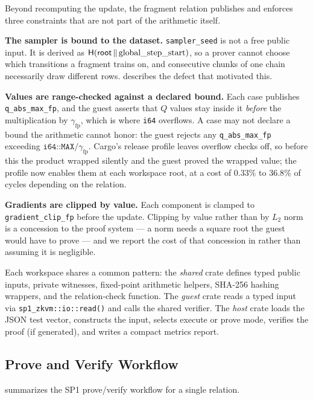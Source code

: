 Beyond recomputing the update, the fragment relation publishes and enforces
three constraints that are not part of the arithmetic itself.

\textbf{The sampler is bound to the dataset.} \texttt{sampler\_seed} is not a
free public input. It is derived as
$\mathsf{H}(\mathsf{root} \,\|\, \mathrm{global\_step\_start})$, so a prover cannot
choose which transitions a fragment trains on, and consecutive chunks of one
chain necessarily draw different rows.  describes
the defect that motivated this.

\textbf{Values are range-checked against a declared bound.} Each case publishes
\texttt{q\_abs\_max\_fp}, and the guest asserts that $Q$ values stay inside it
\emph{before} the multiplication by $\gamma_{\mathrm{fp}}$, which is where \texttt{i64}
overflows. A case may not declare a bound the arithmetic cannot honor: the
guest rejects any \texttt{q\_abs\_max\_fp} exceeding
$\texttt{i64::MAX} / \gamma_{\mathrm{fp}}$. Cargo's release profile leaves overflow checks
off, so before this the product wrapped silently and the guest proved the
wrapped value; the profile now enables them at each workspace root, at a cost
of $0.33\%$ to $36.8\%$ of cycles depending on the relation.

\textbf{Gradients are clipped by value.} Each component is clamped to
\texttt{gradient\_clip\_fp} before the update. Clipping by value rather than by
$L_2$ norm is a concession to the proof system --- a norm needs a square root
the guest would have to prove --- and we report the cost of that concession in
 rather than assuming it is negligible.

\noindent Each workspace shares a common pattern: the \emph{shared} crate
defines typed public inputs, private witnesses, fixed-point arithmetic helpers,
SHA-256 hashing wrappers, and the relation-check function. The \emph{guest}
crate reads a typed input via \texttt{sp1\_zkvm::io::read()} and calls the
shared verifier. The \emph{host} crate loads the JSON test vector, constructs
the input, selects execute or prove mode, verifies the proof (if generated),
and writes a compact metrics report.

\subsection{Prove and Verify Workflow}

 summarizes the SP1 prove/verify workflow for a single
relation.

